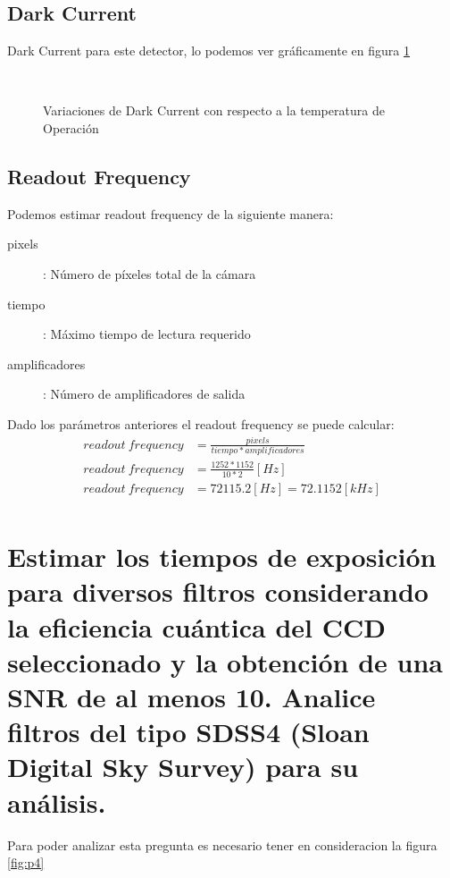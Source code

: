 \documentclass[a4paper,10pt]{article}
\begin{document}
\subsection{Dark Current}
Dark Current para este detector, lo podemos ver gráficamente en figura \ref{fig:p3}
\begin{figure}[ht!]
  \centering
  ~ 
  \caption{Variaciones de Dark Current con respecto a la temperatura de Operación}
  \label{fig:p3}
\end{figure}
\subsection{Readout Frequency}
Podemos estimar readout frequency de la siguiente manera:
\begin{description}
\item [pixels]: Número de píxeles total de la cámara
\item [tiempo]: Máximo tiempo de lectura requerido
\item [amplificadores]: Número de amplificadores de salida
\end{description}

Dado los parámetros anteriores el readout frequency se puede calcular: 
\begin{align*}
readout\ frequency &= \frac{pixels}{tiempo*amplificadores}\\
readout\ frequency &= \frac{1252*1152}{10*2} [Hz]\\
readout\ frequency &= 72115.2 [Hz] = 72.1152 [kHz]\\
\end{align*}




\section{Estimar los tiempos de exposición para diversos filtros considerando la
eficiencia cuántica del CCD seleccionado y la obtención de una SNR de al menos
10. Analice filtros del tipo SDSS4 (Sloan Digital Sky Survey) para su análisis.}
Para poder analizar esta pregunta es necesario tener en consideracion la figura \ref{fig:p4}
\end{document}
